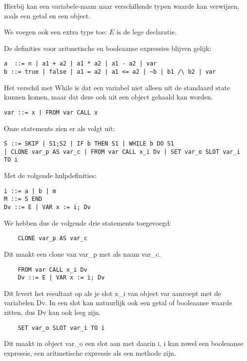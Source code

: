 \documentclass[12pt]{article}
\begin{document}
Hierbij kan een variabele-naam naar verschillende typen waarde kan verwijzen, zoals een getal en een object.

We voegen ook een extra type toe:
$E$ is de lege declaratie.


De definities voor aritmetische en booleaanse expressies blijven gelijk: 
\begin{lstlisting}
a  ::= n | a1 + a2 | a1 * a2 | a1 - a2 | var
b ::= true | false | a1 = a2 | a1 <= a2 | ~b | b1 /\ b2 | var 
\end{lstlisting}

Het verschil met While is dat een variabel niet alleen uit de standaard state kunnen komen, maar dat deze ook uit een object gehaald kan worden. 
\begin{lstlisting}
var ::= x | FROM var CALL x
\end{lstlisting}

Onze statements zien er als volgt uit: 
\begin{lstlisting}
S ::= SKIP | S1;S2 | IF b THEN S1 | WHILE b DO S1
| CLONE var_p AS var_c | FROM var CALL x_i Dv | SET var_o SLOT var_i TO i
\end{lstlisting}

Met de volgende hulpdefinities: 
\begin{lstlisting}
i ::= a | b | m
M ::= S END 
Dv ::= E | VAR x := i; Dv
\end{lstlisting}

We hebben dus de volgende drie statements toegevoegd: 
\begin{lstlisting}
	CLONE var_p AS var_c
\end{lstlisting} 
Dit maakt een clone van var\_p met als naam var\_c. 

\begin{lstlisting}
	FROM var CALL x_i Dv
	Dv ::= E | VAR x := i; Dv
\end{lstlisting}
Dit levert het resultaat op als je slot x\_i van object var aanroept met de variabelen Dv. In een slot kan natuurlijk ook een getal of booleaanse waarde zitten, dus Dv kan ook leeg zijn. 

\begin{lstlisting}
	SET var_o SLOT var_i TO i
\end{lstlisting} 
Dit maakt in object var\_o een slot aan met daarin i. i kan zowel een booleaanse expressie, een aritmetische expressie als een methode zijn. 
\end{document}
